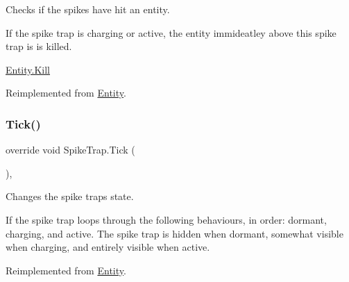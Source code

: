 Checks if the spikes have hit an entity. 

If the spike trap is charging or active, the entity immideatley above this spike trap is is killed. 

\mbox{\hyperlink{class_entity_af02fade3c492c47394ebd4981de96b1d}{Entity.\+Kill}} 

Reimplemented from \mbox{\hyperlink{class_entity_a80e2936e1d8d8590dc183b2980fcd3c9}{Entity}}.

\mbox{\label{class_spike_trap_ae5f99ac571f8c550780bae8eacef23c0}} 
\subsubsection{\texorpdfstring{Tick()}{Tick()}}
{\footnotesize\ttfamily override void Spike\+Trap.\+Tick (\begin{DoxyParamCaption}{ }\end{DoxyParamCaption})\hspace{0.3cm}{\ttfamily [inline]}, {\ttfamily [virtual]}}



Changes the spike trap\textquotesingle{}s state. 

If the spike trap loops through the following behaviours, in order\+: dormant, charging, and active. The spike trap is hidden when dormant, somewhat visible when charging, and entirely visible when active. 

Reimplemented from \mbox{\hyperlink{class_entity_a7a09da64c6d87cd1bce0bb69512d82fc}{Entity}}.

